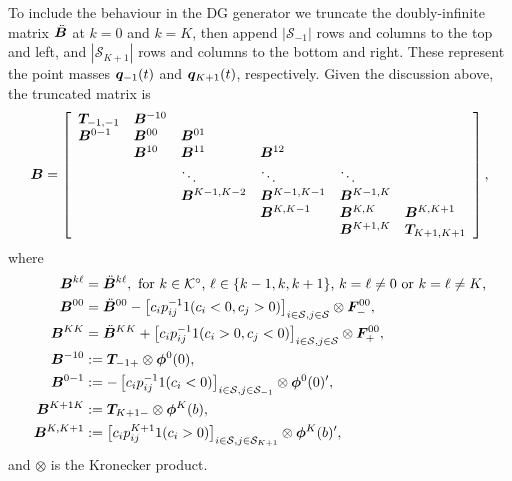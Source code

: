 To include the behaviour in the DG generator we truncate the doubly-infinite matrix \(\ddot{{\boldsymbol B}}\) at \(k=0\) and \(k=K\), then append \(|\mathcal S_{-1}|\) rows and columns to the top and left, and \(|\mathcal S_{K+1}|\) rows and columns to the bottom and right. These represent the point masses \(\boldsymbol q_{-1}(t)\) and \(\boldsymbol q_{K+1}(t)\), respectively. Given the discussion above, the truncated matrix is
\[{{\boldsymbol B}} = \left[\begin{array}{llllll}
	\boldsymbol T_{{-1},{-1}}& {{\boldsymbol B}}^{{-1}0} & & & & \\
	{{\boldsymbol B}}^{0{-1}} & {{\boldsymbol B}}^{00} & {{\boldsymbol B}}^{01} & & & \\
	& {{\boldsymbol B}}^{10} & {{\boldsymbol B}}^{11} & {{\boldsymbol B}}^{12} & & \\
	& & \ddots & \ddots & \ddots & \\
	& & {{\boldsymbol B}}^{K-1,K-2} &{{\boldsymbol B}}^{K-1,K-1} & {{\boldsymbol B}}^{K-1,K} & \\
	& & &{{\boldsymbol B}}^{K,K-1} & {{\boldsymbol B}}^{K,K} & {{\boldsymbol B}}^{K,{K+1}} \\
	& & & & {{\boldsymbol B}}^{{K+1}, K} & \boldsymbol T_{{K+1},{K+1}}
\end{array}\right],\]
where 
\begin{align*}
	{{\boldsymbol B}}^{k\ell} &= \ddot{{\boldsymbol B}}^{k\ell}, \mbox{ for \(k\in\mathcal K^\circ\), \(\ell\in\{k-1,k,k+1\}\), \(k=\ell\neq 0\) or \(k=\ell\neq K\),}
	\\ \boldsymbol B^{00} &= \ddot{\boldsymbol B}^{00} - \left[c_ip_{ij}^{-1} 1(c_i<0, c_j>0)\right]_{i\in\mathcal{S},j\in\mathcal{S}}\otimes \boldsymbol F_-^{00},
	\\ \boldsymbol B^{KK} &= \ddot{\boldsymbol B}^{KK} + \left[c_ip_{ij}^{-1} 1(c_i>0, c_j<0)\right]_{i\in\mathcal{S},j\in\mathcal{S}}\otimes \boldsymbol F_+^{00}, 
	\\ {{\boldsymbol B}}^{{-1}0} &:= \boldsymbol T_{{-1}+}\otimes \boldsymbol\phi^0(0), 
	\\ {{\boldsymbol B}}^{0{-1}} &:=-\left[c_ip_{ij}^{-1} 1{(c_i<0)}\right]_{i\in\mathcal{S},j\in\mathcal{S}_{{-1}}} \otimes \boldsymbol \phi^0(0)'{}, 
	\\ {{\boldsymbol B}}^{{K+1} K} &:= \boldsymbol T_{{K+1}-}\otimes \boldsymbol\phi^K(b),
	\\ {{\boldsymbol B}}^{K,{K+1}} &:= \left[c_ip_{ij}^{K+1} 1{(c_i>0)}\right]_{i\in\mathcal{S},j\in\mathcal{S}_{K+1}} \otimes \boldsymbol \phi^K(b)'{},
\end{align*} 
and \(\otimes\) is the Kronecker product. 

